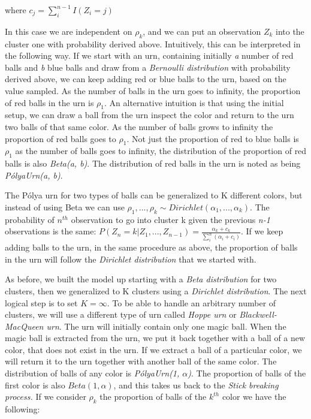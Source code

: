 \documentclass[12pt,a4paper]{article}
\begin{document}
where $c_{j} = \sum_{i}^{n-1}I(Z_{i} = j)$

In this case we are independent on $\rho_{k}$, and we can put an observation $Z_{k}$ into the cluster one with probability derived above. Intuitively, this can be interpreted in the following way. If we start with an urn, containing initially \textit{a} number of red balls and \textit{b} blue balls and draw from a \textit{Bernoulli distribution} with probability derived above, we can keep adding red or blue balls to the urn, based on the value sampled. As the number of balls in the urn goes to infinity, the proportion of red balls in the urn is $\rho_{1}$. An alternative intuition is that using the initial setup, we can draw a ball from the urn inspect the color and return to the urn two balls of that same color. As the number of balls grows to infinity the proportion of red balls goes to $\rho_{1}$. Not just the proportion of red to blue balls is $\rho_{1}$ as the number of balls goes to infinity, the distribution of the proportion of red balls is also \textit{Beta(a, b)}. The distribution of red balls in the urn is noted as being \textit{PólyaUrn(a, b)}.

The Pólya urn for two types of balls can be generalized to K different colors, but instead of using Beta we can use $\rho_{1}, ..., \rho_{k} \sim Dirichlet(\alpha_{1}, ..., \alpha_{k})$. The probability of $n^{th}$ observation to go into cluster k given the previous \textit{n-1} observations is the same:
$P(Z_{n} = k|Z_{1}, ..., Z_{n-1}) = \frac{\alpha_{k} + c_{k}}{\sum_i^n (\alpha_{i} + c_{i})}$. If we keep adding balls to the urn, in the same procedure as above, the proportion of balls in the urn will follow the \textit{Dirichlet distribution} that we started with. 

As before, we built the model up starting with a \textit{Beta distribution} for two clusters, then we generalized to K clusters using a \textit{Dirichlet distribution}. The next logical step is to set $K=\infty$. To be able to handle an arbitrary number of clusters, we will use a different type of urn called \textit{Hoppe urn} or \textit{Blackwell-MacQueen urn}. The urn will initially contain only one magic ball. When the magic ball is extracted from the urn, we put it back together with a ball of a new color, that does not exist in the urn. If we extract a ball of a particular color, we will return it to the urn together with another ball of the same color. The distribution of balls of any color is \textit{PólyaUrn(1, $\alpha$)}. The proportion of balls of the first color is also $Beta(1, \alpha)$, and this takes us back to the \textit{Stick breaking process.} If we consider $\rho_{k}$ the proportion of balls of the $k^{th}$ color we have the following: 
\end{document}
